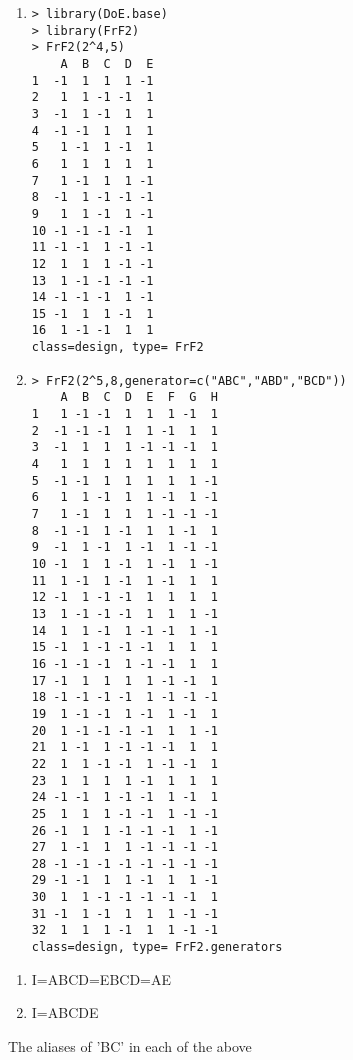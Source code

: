 \documentclass[12pt]{article}
\begin{document}
\begin{enumerate}
\item \hspace{1.0cm}\begin{lstlisting}
> library(DoE.base)
> library(FrF2)
> FrF2(2^4,5)
    A  B  C  D  E
1  -1  1  1  1 -1
2   1  1 -1 -1  1
3  -1  1 -1  1  1
4  -1 -1  1  1  1
5   1 -1  1 -1  1
6   1  1  1  1  1
7   1 -1  1  1 -1
8  -1  1 -1 -1 -1
9   1  1 -1  1 -1
10 -1 -1 -1 -1  1
11 -1 -1  1 -1 -1
12  1  1  1 -1 -1
13  1 -1 -1 -1 -1
14 -1 -1 -1  1 -1
15 -1  1  1 -1  1
16  1 -1 -1  1  1
class=design, type= FrF2 
\end{lstlisting}
\item  \hspace{1.0cm}\begin{lstlisting}
> FrF2(2^5,8,generator=c("ABC","ABD","BCD"))
    A  B  C  D  E  F  G  H
1   1 -1 -1  1  1  1 -1  1
2  -1 -1 -1  1  1 -1  1  1
3  -1  1  1  1 -1 -1 -1  1
4   1  1  1  1  1  1  1  1
5  -1 -1  1  1  1  1  1 -1
6   1  1 -1  1  1 -1  1 -1
7   1 -1  1  1  1 -1 -1 -1
8  -1 -1  1 -1  1  1 -1  1
9  -1  1 -1  1 -1  1 -1 -1
10 -1  1  1 -1  1 -1  1 -1
11  1 -1  1 -1  1 -1  1  1
12 -1  1 -1 -1  1  1  1  1
13  1 -1 -1 -1  1  1  1 -1
14  1  1 -1  1 -1 -1  1 -1
15 -1  1 -1 -1 -1  1  1  1
16 -1 -1 -1  1 -1 -1  1  1
17 -1  1  1  1  1 -1 -1  1
18 -1 -1 -1 -1  1 -1 -1 -1
19  1 -1 -1  1 -1  1 -1  1
20  1 -1 -1 -1 -1  1  1 -1
21  1 -1  1 -1 -1 -1  1  1
22  1  1 -1 -1  1 -1 -1  1
23  1  1  1  1 -1  1  1  1
24 -1 -1  1 -1 -1  1 -1  1
25  1  1  1 -1 -1  1 -1 -1
26 -1  1  1 -1 -1 -1  1 -1
27  1 -1  1  1 -1 -1 -1 -1
28 -1 -1 -1 -1 -1 -1 -1 -1
29 -1 -1  1  1 -1  1  1 -1
30  1  1 -1 -1 -1 -1 -1  1
31 -1  1 -1  1  1  1 -1 -1
32  1  1  1 -1  1  1 -1 -1
class=design, type= FrF2.generators
\end{lstlisting}
\end{enumerate}

\newpage



\begin{enumerate}
  \item I=ABCD=EBCD=AE
  \item I=ABCDE
\end{enumerate}


The aliases of 'BC' in each of the above

\end{document}
